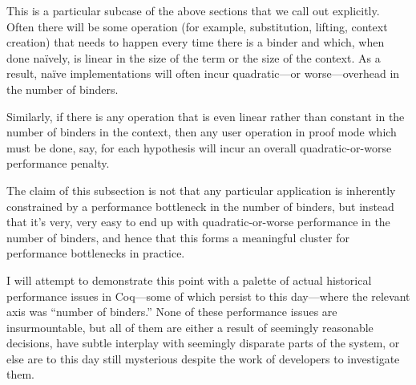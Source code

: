 This is a particular subcase of the above sections that we call out explicitly.
Often there will be some operation (for example, substitution, lifting, context creation) that needs to happen every time there is a binder and which, when done naïvely, is linear in the size of the term or the size of the context.
As a result, naïve implementations will often incur quadratic---or worse---overhead in the number of binders.

%

Similarly, if there is any operation that is even linear rather than constant in the number of binders in the context, then any user operation in proof mode which must be done, say, for each hypothesis will incur an overall quadratic-or-worse performance penalty.

The claim of this subsection is not that any particular application is inherently constrained by a performance bottleneck in the number of binders, but instead that it's very, very easy to end up with quadratic-or-worse performance in the number of binders, and hence that this forms a meaningful cluster for performance bottlenecks in practice.

I will attempt to demonstrate this point with a palette of actual historical performance issues in Coq---some of which persist to this day---where the relevant axis was ``number of binders.''
None of these performance issues are insurmountable, but all of them are either a result of seemingly reasonable decisions, have subtle interplay with seemingly disparate parts of the system, or else are to this day still mysterious despite the work of developers to investigate them.



